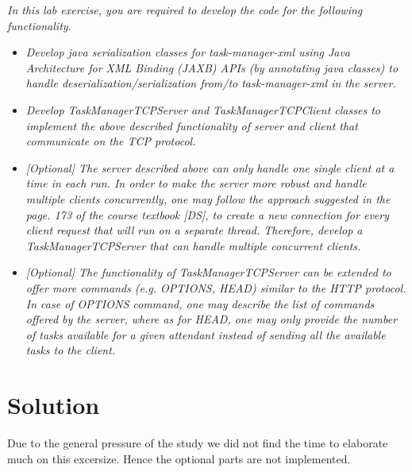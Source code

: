 \textit{In this lab exercise, you are required to develop the code for the following functionality.}\\

\begin{itemize}
\item \textit{Develop java serialization classes for task-manager-xml using Java Architecture for XML Binding (JAXB) APIs (by annotating java classes) to handle deserialization/serialization from/to task-manager-xml in the server.}\\

\item \textit{Develop TaskManagerTCPServer and TaskManagerTCPClient classes to implement the above described functionality of server and client that communicate on the TCP protocol.}\\

\item \textit{[Optional] The server described above can only handle one single client at a time in each run. In order to make the server more robust and handle multiple clients concurrently, one may follow the approach suggested in the page. 173 of the course textbook [DS], to create a new connection for every client request that will run on a separate thread. Therefore, develop a TaskManagerTCPServer that can handle multiple concurrent clients.}\\

\item \textit{[Optional] The functionality of TaskManagerTCPServer can be extended to offer more commands (e.g. OPTIONS, HEAD) similar to the HTTP protocol. In case of OPTIONS command, one may describe the list of commands offered by the server, where as for HEAD, one may only provide the number of tasks available for a given attendant instead of sending all the available tasks to the client.}\\

\end{itemize}



\section{Solution}
\label{tcp_solution}

Due to the general pressure of the study we did not find the time to elaborate much on this excersize. Hence the optional parts are not implemented.\\

